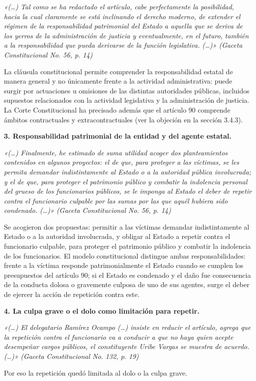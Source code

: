 \begin{cita}
\textit{«(…) Tal como se ha redactado el artículo, cabe perfectamente la posibilidad, hacia la cual claramente se está inclinando el derecho moderno, de extender el régimen de la responsabilidad patrimonial del Estado a aquella que se deriva de los yerros de la administración de justicia y eventualmente, en el futuro, también a la responsabilidad que pueda derivarse de la función legislativa. (…)» (Gaceta Constitucional No. 56, p. 14)}
\end{cita}
La cláusula constitucional permite comprender la responsabilidad estatal de manera general y no únicamente frente a la actividad administrativa: puede surgir por actuaciones u omisiones de las distintas autoridades públicas, incluidos supuestos relacionados con la actividad legislativa y la administración de justicia. La Corte Constitucional ha precisado además que el artículo 90 comprende ámbitos contractuales y extracontractuales (ver la objeción en la sección 3.4.3).

\textbf{3. Responsabilidad patrimonial de la entidad y del agente estatal.}

\begin{cita}
\textit{«(…) Finalmente, he estimado de suma utilidad acoger dos planteamientos contenidos en algunos proyectos: el de que, para proteger a las víctimas, se les permita demandar indistintamente al Estado o a la autoridad pública involucrada; y el de que, para proteger el patrimonio público y combatir la indolencia personal del grueso de los funcionarios públicos, se le imponga al Estado el deber de repetir contra el funcionario culpable por las sumas por las que aquél hubiera sido condenado. (…)» (Gaceta Constitucional No. 56, p. 14)}
\end{cita}
Se acogieron dos propuestas: permitir a las víctimas demandar indistintamente al Estado o a la autoridad involucrada, y obligar al Estado a repetir contra el funcionario culpable, para proteger el patrimonio público y combatir la indolencia de los funcionarios. El modelo constitucional distingue ambas responsabilidades: frente a la víctima responde patrimonialmente el Estado cuando se cumplen los presupuestos del artículo 90; si el Estado es condenado y el daño fue consecuencia de la conducta dolosa o gravemente culposa de uno de sus agentes, surge el deber de ejercer la acción de repetición contra este.

\textbf{4. La culpa grave o el dolo como limitación para repetir.}

\begin{cita}
\textit{«(…) El delegatario Ramírez Ocampo (…) insiste en reducir el artículo, agrega que la repetición contra el funcionario va a conducir a que no haya quien acepte desempeñar cargos públicos, el constituyente Uribe Vargas se muestra de acuerdo. (…)» (Gaceta Constitucional No. 132, p. 19)}
\end{cita}
Por eso la repetición quedó limitada al dolo o la culpa grave.


